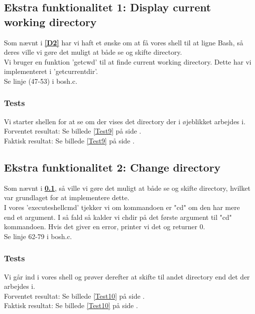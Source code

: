 \subsection{Ekstra funktionalitet 1: Display current working directory}
\label{E1}
Som nævnt i \textbf{\ref{D2}} har vi haft et ønske om at få vores shell til at ligne Bash, så deres ville vi gøre det muligt at både se og skifte directory.
\\Vi bruger en funktion 'getcwd' til at finde current working directory. Dette har vi implementeret i 'getcurrentdir'.
\\Se linje (47-53) i bosh.c.
\subsubsection{Tests}
Vi starter shellen for at se om der vises det directory der i øjeblikket arbejdes i.
\\Forventet resultat: Se billede \ref{Test9} på side \pageref{Test9}.
\\Faktisk resultat: Se billede \ref{Test9} på side \pageref{Test9}.

\subsection{Ekstra funktionalitet 2: Change directory}
\label{E2}
Som nævnt i \textbf{\ref{E1}}, så ville vi gøre det muligt at både se og skifte directory, hvilket var grundlaget for at implementere dette.
\\I vores 'executeshellcmd' tjekker vi om kommandoen er "cd" om den har mere end et argument. I så fald så kalder vi chdir på det første argument til "cd" kommandoen. Hvis det giver en error, printer vi det og returner 0.
\\Se linje 62-79 i bosh.c.
\subsubsection{Tests}
Vi går ind i vores shell og prøver derefter at skifte til andet directory end det der arbejdes i.
\\Forventet resultat: Se billede \ref{Test10} på side \pageref{Test10}.
\\Faktisk resultat: Se billede \ref{Test10} på side \pageref{Test10}.